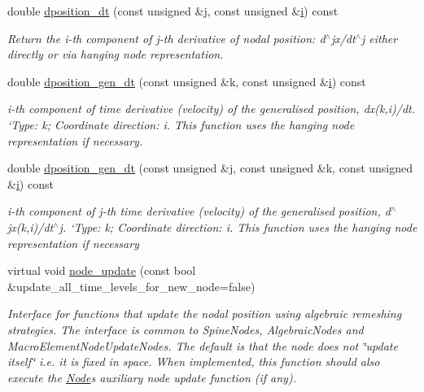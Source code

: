 \begin{DoxyCompactItemize}
double \hyperlink{classoomph_1_1Node_a93be34f3311eaaabc026bd1df86b4cf1}{dposition\+\_\+dt} (const unsigned \&j, const unsigned \&\hyperlink{cfortran_8h_adb50e893b86b3e55e751a42eab3cba82}{i}) const
\begin{DoxyCompactList}\small\item\em Return the i-\/th component of j-\/th derivative of nodal position\+: d$^\wedge$jx/dt$^\wedge$j either directly or via hanging node representation. \end{DoxyCompactList}\item 
double \hyperlink{classoomph_1_1Node_af99eb195bbe21b6e380681f2167fbfb5}{dposition\+\_\+gen\+\_\+dt} (const unsigned \&k, const unsigned \&\hyperlink{cfortran_8h_adb50e893b86b3e55e751a42eab3cba82}{i}) const
\begin{DoxyCompactList}\small\item\em i-\/th component of time derivative (velocity) of the generalised position, dx(k,i)/dt. `\+Type\textquotesingle{}\+: k; Coordinate direction\+: i. This function uses the hanging node representation if necessary. \end{DoxyCompactList}\item 
double \hyperlink{classoomph_1_1Node_ae2528428e2fd8fedf035a54e63cee692}{dposition\+\_\+gen\+\_\+dt} (const unsigned \&j, const unsigned \&k, const unsigned \&\hyperlink{cfortran_8h_adb50e893b86b3e55e751a42eab3cba82}{i}) const
\begin{DoxyCompactList}\small\item\em i-\/th component of j-\/th time derivative (velocity) of the generalised position, d$^\wedge$jx(k,i)/dt$^\wedge$j. `\+Type\textquotesingle{}\+: k; Coordinate direction\+: i. This function uses the hanging node representation if necessary \end{DoxyCompactList}\item 
virtual void \hyperlink{classoomph_1_1Node_aecf8c979266300d3609de2b4ddfa3cc8}{node\+\_\+update} (const bool \&update\+\_\+all\+\_\+time\+\_\+levels\+\_\+for\+\_\+new\+\_\+node=false)
\begin{DoxyCompactList}\small\item\em Interface for functions that update the nodal position using algebraic remeshing strategies. The interface is common to Spine\+Nodes, Algebraic\+Nodes and Macro\+Element\+Node\+Update\+Nodes. The default is that the node does not \char`\"{}update itself\char`\"{} i.\+e. it is fixed in space. When implemented, this function should also execute the \hyperlink{classoomph_1_1Node}{Node}\textquotesingle{}s auxiliary node update function (if any). \end{DoxyCompactList}\item 

\end{DoxyCompactItemize}
